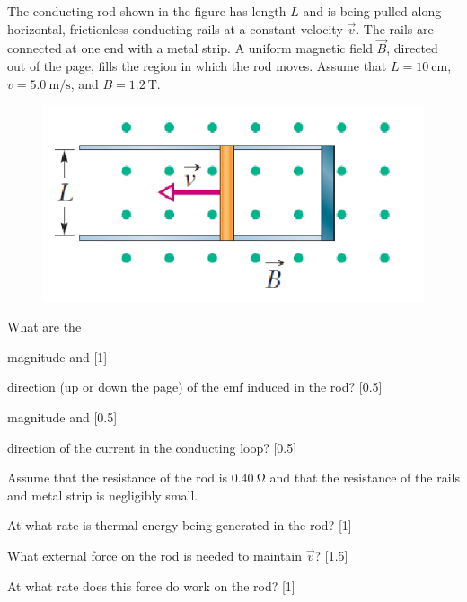 \begin{problem}
    The conducting rod shown in the figure has length $L$ and is being pulled along horizontal, frictionless conducting rails at a constant velocity $\vec{v}$. The rails are connected at one end with a metal strip. A uniform magnetic field $\vec{B}$, directed out of the page, fills the region in which the rod moves. Assume that $L = \qty{10}{\cm}$, $v = \qty{5.0}{\m\per\s}$, and $B = \qty{1.2}{\tesla}$. 
    \begin{figure}[H]
        \centering
        \includegraphics{spho_book_TYS_images/2021SPhO_3.png}
    \end{figure}
    What are the
    \begin{subproblemalph}
        \item magnitude and \hfill [1]
        \item direction (up or down the page) of the emf induced in the rod? \hfill [0.5]
        \item magnitude and \hfill [0.5]
        \item direction of the current in the conducting loop? \hfill [0.5]
    \end{subproblemalph}
    Assume that the resistance of the rod is $\qty{0.40}{\ohm}$ and that the resistance of the rails and metal strip is negligibly small.
    \begin{subproblemalph}
        \setcounter{enumi}{4}
        \item At what rate is thermal energy being generated in the rod? \hfill [1]
        \item What external force on the rod is needed to maintain $\vec{v}$? \hfill [1.5]
        \item At what rate does this force do work on the rod? \hfill [1]
    \end{subproblemalph}
\end{problem}


